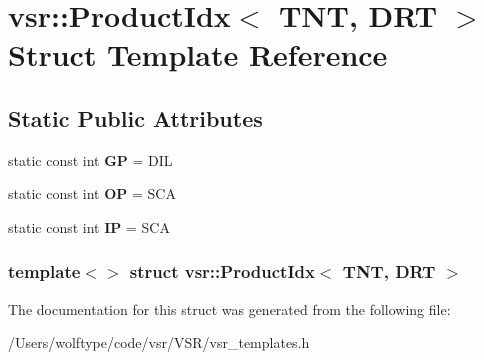 \hypertarget{structvsr_1_1_product_idx_3_01_t_n_t_00_01_d_r_t_01_4}{\section{vsr\-:\-:Product\-Idx$<$ T\-N\-T, D\-R\-T $>$ Struct Template Reference}
\label{structvsr_1_1_product_idx_3_01_t_n_t_00_01_d_r_t_01_4}
}
\subsection*{Static Public Attributes}
\begin{DoxyCompactItemize}
\item 
\hypertarget{structvsr_1_1_product_idx_3_01_t_n_t_00_01_d_r_t_01_4_a194073df3ea34e5d5e99084bd7bc7a03}{static const int {\bfseries G\-P} = D\-I\-L}\label{structvsr_1_1_product_idx_3_01_t_n_t_00_01_d_r_t_01_4_a194073df3ea34e5d5e99084bd7bc7a03}

\item 
\hypertarget{structvsr_1_1_product_idx_3_01_t_n_t_00_01_d_r_t_01_4_a84c958777d1aee740bd55c9a64addfc8}{static const int {\bfseries O\-P} = S\-C\-A}\label{structvsr_1_1_product_idx_3_01_t_n_t_00_01_d_r_t_01_4_a84c958777d1aee740bd55c9a64addfc8}

\item 
\hypertarget{structvsr_1_1_product_idx_3_01_t_n_t_00_01_d_r_t_01_4_a43ec9bf3a00e8c757402bfc8e1df621e}{static const int {\bfseries I\-P} = S\-C\-A}\label{structvsr_1_1_product_idx_3_01_t_n_t_00_01_d_r_t_01_4_a43ec9bf3a00e8c757402bfc8e1df621e}

\end{DoxyCompactItemize}
\subsubsection*{template$<$$>$ struct vsr\-::\-Product\-Idx$<$ T\-N\-T, D\-R\-T $>$}



The documentation for this struct was generated from the following file\-:\begin{DoxyCompactItemize}
\item 
/\-Users/wolftype/code/vsr/\-V\-S\-R/vsr\-\_\-templates.\-h\end{DoxyCompactItemize}
